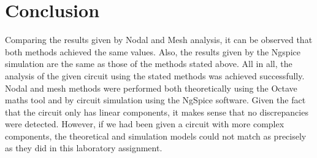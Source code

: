 \section{Conclusion}
\label{sec:conclusion}
Comparing the results given by Nodal and Mesh analysis, it can be observed that both methods achieved the same values. Also, the results given by the Ngspice simulation are the same as those of the methods stated above.  
All in all, the analysis of the given circuit using the stated methods was achieved successfully. Nodal and mesh methods were performed both theoretically using the Octave maths tool and by circuit simulation using the NgSpice software. 
Given the fact that the circuit only has linear components, it makes sense that no discrepancies were detected. However, if we had been given a circuit with more complex components, the theoretical and simulation models could not match as precisely as they did in this laboratory assignment.

